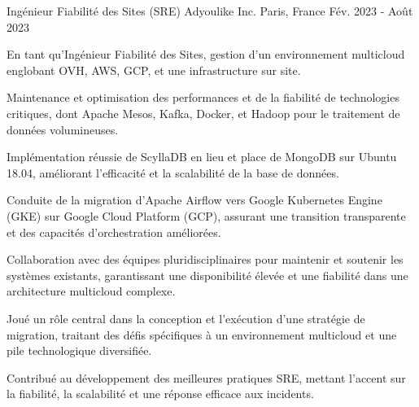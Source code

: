 \begin{cventries}
{%
  \cventry
    {Ingénieur Fiabilité des Sites (SRE)} %
    {Adyoulike Inc.} %
    {Paris, France} %
    {Fév. 2023 - Août 2023} %
    {
      \begin{cvitems} %
        \item {En tant qu'Ingénieur Fiabilité des Sites, gestion d'un environnement multicloud englobant OVH, AWS, GCP, et une infrastructure sur site.}
        \item {Maintenance et optimisation des performances et de la fiabilité de technologies critiques, dont Apache Mesos, Kafka, Docker, et Hadoop pour le traitement de données volumineuses.}
        \item {Implémentation réussie de ScyllaDB en lieu et place de  MongoDB sur Ubuntu 18.04, améliorant l'efficacité et la scalabilité de la base de données.}
        \item {Conduite de la migration d'Apache Airflow vers Google Kubernetes Engine (GKE) sur Google Cloud Platform (GCP), assurant une transition transparente et des capacités d'orchestration améliorées.}
        \item {Collaboration avec des équipes pluridisciplinaires pour maintenir et soutenir les systèmes existants, garantissant une disponibilité élevée et une fiabilité dans une architecture multicloud complexe.}
        \item {Joué un rôle central dans la conception et l'exécution d'une stratégie de migration, traitant des défis spécifiques à un environnement multicloud et une pile technologique diversifiée.}
        \item {Contribué au développement des meilleures pratiques SRE, mettant l'accent sur la fiabilité, la scalabilité et une réponse efficace aux incidents.}
      \end{cvitems}
      
    }

}
\end{cventries}
